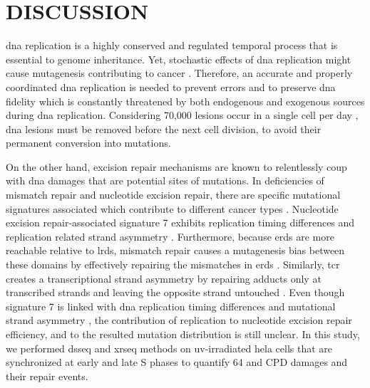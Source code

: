 \setlength{\parindent}{0pt}
\chapter{\bf DISCUSSION}

\gls{dna} replication is a highly conserved and regulated temporal process that is essential to genome inheritance. Yet, stochastic effects of \gls{dna} replication might cause mutagenesis contributing to cancer \citep{tomasetti2015variation}. Therefore, an accurate and properly coordinated \gls{dna} replication is needed to prevent errors and to preserve \gls{dna} fidelity which is constantly threatened by both endogenous and exogenous sources during \gls{dna} replication. Considering 70,000 lesions occur in a single cell per day \citep{lindahl2000repair}, \gls{dna} lesions must be removed before the next cell division, to avoid their permanent conversion into mutations. 

On the other hand, excision repair mechanisms are known to relentlessly coup with \gls{dna} damages that are potential sites of mutations. In deficiencies of mismatch repair and nucleotide excision repair, there are specific mutational signatures associated which contribute to different cancer types \citep{helleday2014mechanisms}. Nucleotide excision repair-associated signature 7 exhibits replication timing differences and replication related strand asymmetry \citep{tomkova2018mutational}. Furthermore, because \gls{erd}s are more reachable relative to \gls{lrd}s, mismatch repair causes a mutagenesis bias between these domains by effectively repairing the mismatches in \gls{erd}s \citep{supek2015differential}. Similarly, \gls{tcr} creates a transcriptional strand asymmetry by repairing adducts only at transcribed strands and leaving the opposite strand untouched \citep{zheng2014transcription}. Even though signature 7 is linked with \gls{dna} replication timing differences and mutational strand asymmetry \citep{tomkova2018mutational}, the contribution of replication to nucleotide excision repair efficiency, and to the resulted mutation distribution is still unclear. In this study, we performed \gls{dsseq} and \gls{xrseq} methods on \gls{uv}-irradiated \gls{hela} cells that are synchronized at early and late S phases to quantify \gls{64} and \gls{CPD} damages and their repair events. 

